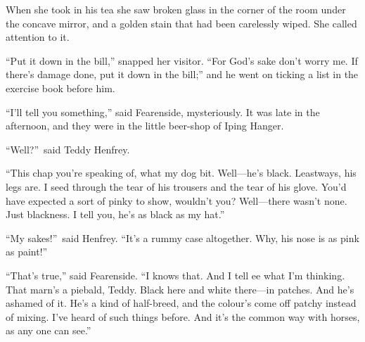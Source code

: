 When she took in his tea she saw broken glass in the corner of the room under the concave mirror, and a golden stain that had been carelessly wiped. She called attention to it.

“Put it down in the bill,” snapped her visitor. “For God’s sake don’t worry me. If there’s damage done, put it down in the bill;” and he went on ticking a list in the exercise book before him.

\scenestars

“I’ll tell you something,” said Fearenside, mysteriously. It was late in the afternoon, and they were in the little beer-shop of Iping Hanger.

“Well?”\ said Teddy Henfrey.

“This chap you’re speaking of, what my dog bit. Well—\linebreak{}he’s black. Leastways, his legs are. I seed through the tear of his trousers and the tear of his glove. You’d have expected a sort of pinky to show, wouldn’t you? Well—there wasn’t none. Just blackness. I tell you, he’s as black as my hat.”

“My sakes!”\ said Henfrey. “It’s a rummy case altogether. Why, his nose is as pink as paint!”

“That’s true,” said Fearenside. “I knows that. And I tell ee what I’m thinking. That marn’s a piebald, Teddy. Black here and white there—in patches. And he’s ashamed of it. He’s a kind of half-breed, and the colour’s come off patchy instead of mixing. I’ve heard of such things before. And it’s the common way with horses, as any one can see.”